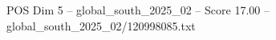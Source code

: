 \begin{textsample}{POS Dim 5 – global\_south\_2025\_02 – Score 17.00 – global\_south\_2025\_02/120998085.txt}
\end{textsample}
